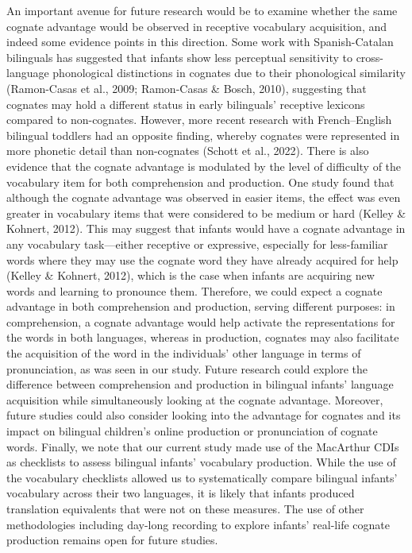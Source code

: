 \documentclass[
  ,man,floatsintext]{apa6}
\begin{document}
An important avenue for future research would be to examine whether the same cognate advantage would be observed in receptive vocabulary acquisition, and indeed some evidence points in this direction. Some work with Spanish-Catalan bilinguals has suggested that infants show less perceptual sensitivity to cross-language phonological distinctions in cognates due to their phonological similarity (Ramon-Casas et al., 2009; Ramon-Casas \& Bosch, 2010), suggesting that cognates may hold a different status in early bilinguals' receptive lexicons compared to non-cognates. However, more recent research with French--English bilingual toddlers had an opposite finding, whereby cognates were represented in more phonetic detail than non-cognates (Schott et al., 2022). There is also evidence that the cognate advantage is modulated by the level of difficulty of the vocabulary item for both comprehension and production. One study found that although the cognate advantage was observed in easier items, the effect was even greater in vocabulary items that were considered to be medium or hard (Kelley \& Kohnert, 2012). This may suggest that infants would have a cognate advantage in any vocabulary task---either receptive or expressive, especially for less-familiar words where they may use the cognate word they have already acquired for help (Kelley \& Kohnert, 2012), which is the case when infants are acquiring new words and learning to pronounce them. Therefore, we could expect a cognate advantage in both comprehension and production, serving different purposes: in comprehension, a cognate advantage would help activate the representations for the words in both languages, whereas in production, cognates may also facilitate the acquisition of the word in the individuals' other language in terms of pronunciation, as was seen in our study. Future research could explore the difference between comprehension and production in bilingual infants' language acquisition while simultaneously looking at the cognate advantage. Moreover, future studies could also consider looking into the advantage for cognates and its impact on bilingual children's online production or pronunciation of cognate words. Finally, we note that our current study made use of the MacArthur CDIs as checklists to assess bilingual infants' vocabulary production. While the use of the vocabulary checklists allowed us to systematically compare bilingual infants' vocabulary across their two languages, it is likely that infants produced translation equivalents that were not on these measures. The use of other methodologies including day-long recording to explore infants' real-life cognate production remains open for future studies.
\end{document}
